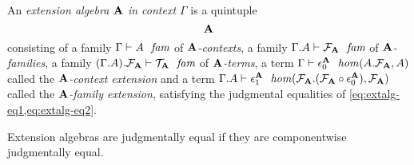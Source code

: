 \begin{defn}\label{defn:extension-algebras}
An \emph{extension algebra $\mathbf{A}$ in context $\Gamma$} is a quintuple
\begin{equation*}
\unfold{\extalg{A}}
\end{equation*}
consisting of a family $\jextalgctx{\Gamma}{A}$ of \emph{$\mathbf{A}$-contexts}, 
a family $\jextalgfam{\Gamma}{A}$ of \emph{$\mathbf{A}$-families}, a family 
$\jextalgtm{\Gamma}{A}$ of \emph{$\mathbf{A}$-terms}, a term
$\jextalgctxext{\Gamma}{A}$ called the \emph{$\mathbf{A}$-context extension}
and a term $\jextalgfamext{\Gamma}{A}$ called the \emph{$\mathbf{A}$-family
extension}, satisfying the judgmental equalities of
\autoref{eq:extalg-eq1,eq:extalg-eq2}.
\begin{comment}
We define the judgment
\begin{equation*}
\jextalg{\Gamma}{A}
\end{equation*}
asserting that $\extalg{A}$ is an \emph{extension algebra in context $\Gamma$}
to be the conjunction of the following seven judmgents:
\begin{align*}
\jalign\jextalgctx{\Gamma}{A}
  \\
\jalign\jextalgfam{\Gamma}{A}
  \\
\jalign\jextalgtm{\Gamma}{A}
  \\
\jalign\jextalgctxext{\Gamma}{A}
  \\
\jalign\jextalgfamext{\Gamma}{A}
  \\
\jalign\jhomeq
  { \Gamma}
  { {\cftalgc{\cftalg{A}}}
    { {\cftalgf{\cftalg{A}}}
      {\jcomp{}{\cftctxext[\cftalg{A}]}{\cftalgf{\cftalg{A}}}}
      }
    }
  { \cftalgc{\cftalg{A}}}
  { \jcomp{}
      { \jvcomp{}
          {\cftctxext[\cftalg{A}]}
          {\idtm{\jcomp{}{\cftctxext[\cftalg{A}]}{\cftalgf{\cftalg{A}}}}}
        }
      { \cftctxext[\cftalg{A}]}
    }
  { \jcomp{}
      { \jvcomp{}
          {\idtm{\cftalgc{\cftalg{A}}}}
          {\cftfamext[\cftalg{A}]}
        }
      { \cftctxext[\cftalg{A}]}
    }
  \\
\jalign\jhomeq
  { {\Gamma}{\cftalgc{\cftalg{A}}}}
  { { \cftalgf{\cftalg{A}}}
    { { \jcomp{}{\cftctxext[\cftalg{A}]}{\cftalgf{\cftalg{A}}}}
      { \jcomp{}
          {\cftctxext[\cftalg{A}]}
          {{}{\cftctxext[\cftalg{A}]}{\cftalgf{\cftalg{A}}}}
        }
      }
    }
  { \cftalgf{\cftalg{A}}}
  { \jcomp{}
      { \cftfamext[\cftalg{A}]}
      { \jvcomp{}
          {\cftfamext[\cftalg{A}]}
          {\idtm{\jcomp{}{\cftfamext[\cftalg{A}]}{{}{\cftctxext[\cftalg{A}]}{\cftalgf{\cftalg{A}}}}}}}
    }
  { \jcomp{}
      { \cftfamext[\cftalg{A}]}
      { \jvcomp{}
          {\idtm{\cftalgf{\cftalg{A}}}}
          {\jcomp{}{\cftctxext[\cftalg{A}]}{\cftfamext[\cftalg{A}]}}
        }
    }
\end{align*}
In other words, an extension algebra $\extalg{A}$ in context $\Gamma$
is a quintuple $\unfold{\extalg{A}}$ 
satisfying the judgmental equalities displayed in the diagrams in
\autoref{eq:extalg-eq1,eq:extalg-eq2}.
\end{comment}
Extension algebras are judgmentally
equal if they are componentwise judgmentally equal.


\end{defn}
